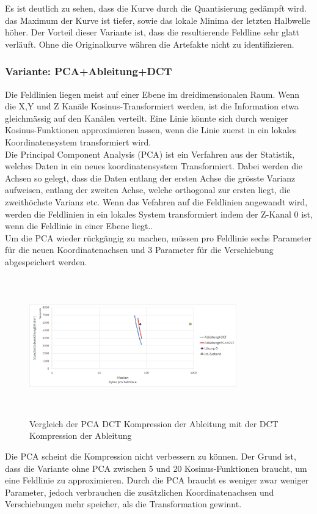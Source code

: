 Es ist deutlich zu sehen, dass die Kurve durch die Quantisierung gedämpft wird. das Maximum der Kurve ist tiefer, sowie das lokale Minima der letzten Halbwelle höher. Der Vorteil dieser Variante ist, dass die resultierende Feldline sehr glatt verläuft. Ohne die Originalkurve währen die Artefakte nicht zu identifizieren.

\subsubsection{Variante: PCA+Ableitung+DCT}
Die Feldlinien liegen meist auf einer Ebene im dreidimensionalen Raum. Wenn die X,Y und Z Kanäle Kosinus-Transformiert werden, ist die Information etwa gleichmässig auf den Kanälen verteilt. Eine Linie könnte sich durch weniger Kosinus-Funktionen approximieren lassen, wenn die Linie zuerst in ein lokales Koordinatensystem transformiert wird.\\
Die Principal Component Analysis (PCA)\cite{abdi2010principal} ist ein Verfahren aus der Statistik, welches Daten in ein neues koordinatensystem Transformiert. Dabei werden die Achsen so gelegt, dass die Daten entlang der ersten Achse die grösste Varianz aufweisen, entlang der zweiten Achse, welche orthogonal zur ersten liegt, die zweithöchste Varianz etc. Wenn das Vefahren auf die Feldlinien angewandt wird, werden die Feldlinien in ein lokales System transformiert indem der Z-Kanal 0 ist, wenn die Feldlinie in einer Ebene liegt..\\
Um die PCA wieder rückgängig zu machen, müssen pro Feldlinie sechs Parameter für die neuen Koordinatenachsen und 3 Parameter für die Verschiebung abgespeichert werden.
\begin{figure}[!htbp]
	\center
	\includegraphics[width=0.8\textwidth,height=6cm,keepaspectratio]{./pictures/resultate/loesung1/loesung1-4/loesung1_4.png}
	\caption{Vergleich der PCA DCT Kompression der Ableitung mit der DCT Kompression der Ableitung}
	\label{resultate:loesung1:dct:pca}
\end{figure}
Die PCA scheint die Kompression nicht verbessern zu können. Der Grund ist, dass die Variante ohne PCA zwischen 5 und 20 Kosinus-Funktionen braucht, um eine Feldlinie zu approximieren. Durch die PCA braucht es weniger zwar weniger Parameter, jedoch verbrauchen die zusätzlichen Koordinatenachsen und Verschiebungen mehr speicher, als die Transformation gewinnt.

